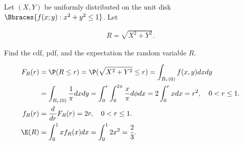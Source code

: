 
\begin{exercise}

Let $(X, Y)$ be uniformly distributed on the unit disk $\Bbraces{f(x; y): x^2 + y^2 \leq 1}$.
Let

\begin{align*}
    R = \sqrt{X^2 + Y^2}.
\end{align*}

Find the cdf, pdf, and the expectation the random variable $R$.

\end{exercise}


\begin{solution}

\begin{align*}
  F_R(r) &= \P(R \leq r) = \P(\sqrt{X^2 + Y^2} \leq r) = \int_{B_r(0)} f(x,y) dx dy \\
  &= \int_{B_r(0)} \frac{1}{\pi} dx dy = \int_0^r\int_0^{2\pi} \frac{x}{\pi} d\phi dx
  = 2\int_0^r x dx = r^2, \quad 0 < r \leq 1. \\
  f_R(r) &= \frac{d}{dr}F_R(r) = 2r, \quad 0 < r \leq 1.  \\
  \E(R) &= \int_0^1 x f_R(x) dx = \int_0^1 2x^2 = \frac{2}{3}.
\end{align*}

\end{solution}

